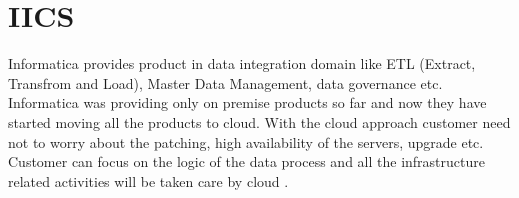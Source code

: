 \section{IICS}

Informatica provides product in data integration domain like ETL (Extract, Transfrom and Load), Master Data Management, data governance etc. Informatica was providing only on premise products so far and now they have started moving all the products to cloud. With the cloud approach customer need not to worry about the patching, high availability of the servers, upgrade etc. Customer can focus on the logic of the data process and all the infrastructure related activities will be taken care by cloud \cites{hid-sp18-511-iics}.

